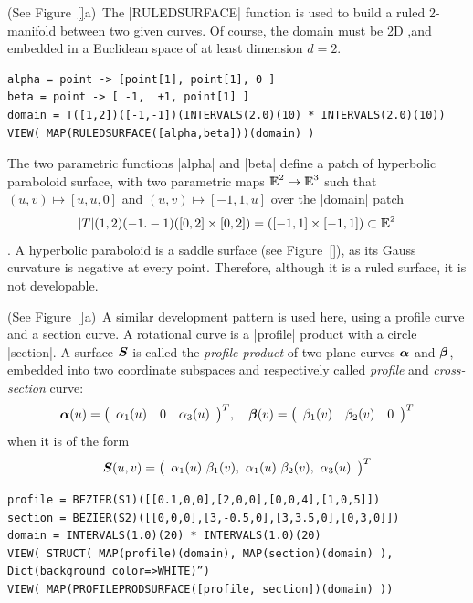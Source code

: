 \begin{coding}[Algebraic computation of FE = $\delta_1$]
\begin{condition} (See Figure~\ref{}a)\
The |RULEDSURFACE| function is used to build a ruled 2-manifold between two given curves. Of course, the domain must be 2D ,and embedded in a Euclidean space of at least dimension $d=2$.
\begin{lstlisting}[language=JuliaLocal, style=julia, mathescape=true]
alpha = point -> [point[1], point[1], 0 ]
beta = point -> [ -1,  +1, point[1] ]
domain = T([1,2])([-1,-1])(INTERVALS(2.0)(10) * INTERVALS(2.0)(10))
VIEW( MAP(RULEDSURFACE([alpha,beta]))(domain) )
\end{lstlisting}
The two parametric functions |alpha| and |beta| define a patch  of hyperbolic paraboloid surface, with two parametric maps $\mathbb{I\!\!E}^2\to\mathbb{I\!\!E}^3$ such that $(u,v)\mapsto[u,u,0]$ and $(u,v)\mapsto[-1,1,u]$ over the |domain| patch $$|T|(1,2)(-1.-1)([0,2]\times[0,2])=([-1,1]\times[-1,1])\subset\mathbb{I\!\!E}^2$$.
A hyperbolic paraboloid is a saddle surface (see Figure~\ref{}), as its Gauss curvature is negative at every point. Therefore, although it is a ruled surface, it is not developable. 
\end{condition}

\begin{condition}[(Profile product patch] (See Figure~\ref{}a)\ A similar development pattern is used here, using a profile curve and a section curve. A rotational curve is a |profile| product with a circle |section|. A surface ${\mbox{\boldmath $S$}}$ is called the {\it profile
product} of two plane curves ${\mbox{\boldmath $\alpha$}}$ and ${\mbox{\boldmath $\beta$}}$, embedded
into two coordinate subspaces and respectively called {\it profile}
and {\it cross-section} curve:
\[ 
{\mbox{\boldmath $\alpha$}}(u) = {\left(\begin{array}{cccccccc}\alpha_1(u) & 0 & \alpha_3(u)\end{array}\right)}^{T}, \quad
{\mbox{\boldmath $\beta$}}(v) = {\left(\begin{array}{cccccccc}\beta_1(v) & \beta_2(v) & 0\end{array}\right)}^{T}
\]
when it is of the form
\[
{\mbox{\boldmath $S$}}(u,v) = 
{\left(\begin{array}{cccccccc}\alpha_1(u)\ \beta_1(v), \  \alpha_1(u)\ \beta_2(v), \  
\alpha_3(u)\end{array}\right)}^{T}
\]
\begin{lstlisting}[language=JuliaLocal, style=julia, mathescape=true]
profile = BEZIER(S1)([[0.1,0,0],[2,0,0],[0,0,4],[1,0,5]])
section = BEZIER(S2)([[0,0,0],[3,-0.5,0],[3,3.5,0],[0,3,0]])
domain = INTERVALS(1.0)(20) * INTERVALS(1.0)(20)
VIEW( STRUCT( MAP(profile)(domain), MAP(section)(domain) ), Dict(background_color=>WHITE)”)
VIEW( MAP(PROFILEPRODSURFACE([profile, section])(domain) ))
\end{lstlisting}
\end{condition}


\end{coding}
